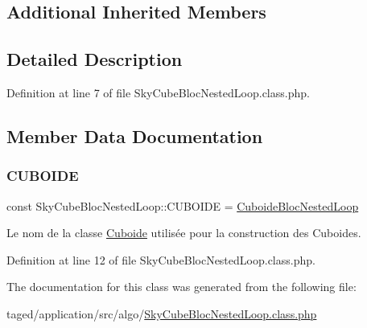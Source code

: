 \subsection*{Additional Inherited Members}


\subsection{Detailed Description}


Definition at line 7 of file Sky\+Cube\+Bloc\+Nested\+Loop.\+class.\+php.



\subsection{Member Data Documentation}
\mbox{\label{class_sky_cube_bloc_nested_loop_a680905c28bba7313409d01b0bbfac33a}} 
\subsubsection{\texorpdfstring{C\+U\+B\+O\+I\+DE}{CUBOIDE}}
{\footnotesize\ttfamily const Sky\+Cube\+Bloc\+Nested\+Loop\+::\+C\+U\+B\+O\+I\+DE = \textquotesingle{}\hyperlink{class_cuboide_bloc_nested_loop}{Cuboide\+Bloc\+Nested\+Loop}\textquotesingle{}}

Le nom de la classe \hyperlink{class_cuboide}{Cuboide} utilisée pour la construction des Cuboides. 

Definition at line 12 of file Sky\+Cube\+Bloc\+Nested\+Loop.\+class.\+php.



The documentation for this class was generated from the following file\+:\begin{DoxyCompactItemize}
\item 
taged/application/src/algo/\hyperlink{_sky_cube_bloc_nested_loop_8class_8php}{Sky\+Cube\+Bloc\+Nested\+Loop.\+class.\+php}\end{DoxyCompactItemize}
